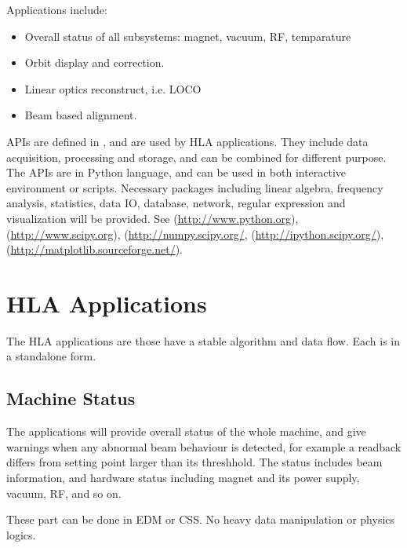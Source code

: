\documentclass[letterpaper,showtrims]{memoir}
\begin{document}
Applications include:
\begin{itemize}
\item Overall status of all subsystems: magnet, vacuum, RF, temparature
\item Orbit display and correction.
\item Linear optics reconstruct, i.e. LOCO
\item Beam based alignment.
\end{itemize}

APIs are defined in \cite{shen_hla_apis}, and are used by HLA
applications. They include data acquisition, processing and storage, and
can be combined for different purpose. The APIs are in Python language,
and can be used in both interactive environment or scripts. Necessary
packages including linear algebra, frequency analysis, statistics, data
IO, database, network, regular expression and visualization will be
provided. See \cite{Python} (\url{http://www.python.org}), \cite{SciPy}
(\url{http://www.scipy.org}), \cite{NumPy}
(\url{http://numpy.scipy.org/}, \cite{iPython}
(\url{http://ipython.scipy.org/}), \cite{Matplotlib}
(\url{http://matplotlib.sourceforge.net/}).


\section{HLA Applications}

The HLA applications are those have a stable algorithm and data
flow. Each is in a standalone form.


\subsection{Machine Status}

The applications will provide overall status of the whole machine, and
give warnings when any abnormal beam behaviour is detected, for example
a readback differs from setting point larger than its threshhold. The
status includes beam information, and hardware status including magnet
and its power supply, vacuum, RF, and so on.

These part can be done in EDM or CSS. No heavy data manipulation or
physics logics.
\end{document}
